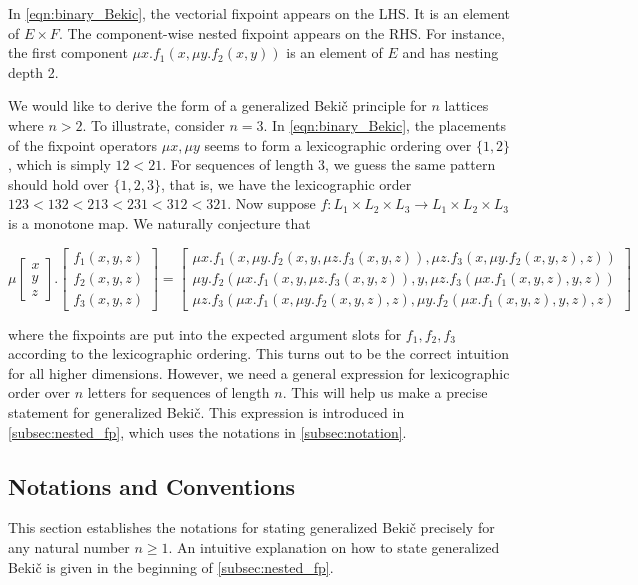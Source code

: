 In \autoref{eqn:binary_Bekic}, the vectorial fixpoint appears on the LHS. It is an element of $E\times F$. The component-wise nested fixpoint appears on the RHS. For instance, the first component $\mu x. f_1(x,\mu y.f_2(x,y))$ is an element of $E$ and has nesting depth 2.

We would like to derive the form of a generalized Beki\v{c} principle for $n$ lattices where $n>2$. To illustrate, consider $n=3$. In \autoref{eqn:binary_Bekic}, the placements of the fixpoint operators $\mu x, \mu y$ seems to form a lexicographic ordering over $\{1,2\}$, which is simply $12 < 21$. For sequences of length 3, we guess the same pattern should hold over $\{1,2,3\}$, that is, we have the lexicographic order $123 < 132 < 213 < 231 < 312 < 321$. Now suppose $f:L_1\times L_2\times L_3\rightarrow L_1\times L_2\times L_3$ is a monotone map. We naturally conjecture that

\begin{equation}
\label{eqn_3}
    \mu \begin{bmatrix}
        x \\ y \\ z
    \end{bmatrix}. \begin{bmatrix}
        f_1(x,y,z) \\
        f_2(x,y,z) \\
        f_3(x,y,z)
    \end{bmatrix} = \begin{bmatrix}
        \mu x. f_1(x,\mu y.f_2(x,y,\mu z. f_3(x,y,z)), \mu z. f_3(x,\mu y.f_2(x,y,z),z)) \\
        \mu y. f_2(\mu x.f_1(x,y,\mu z. f_3(x,y,z)), y, \mu z. f_3(\mu x. f_1(x,y,z), y ,z)) \\
        \mu z. f_3(\mu x.f_1(x,\mu y. f_2(x,y,z),z),\mu y.f_2(\mu x.f_1(x,y,z),y,z),z)
    \end{bmatrix}
\end{equation}

where the fixpoints are put into the expected argument slots for $f_1,f_2,f_3$ according to the lexicographic ordering. This turns out to be the correct intuition for all higher dimensions. However, we need a general expression for lexicographic order over $n$ letters for sequences of length $n$. This will help us make a precise statement for generalized Beki\v{c}. This expression is introduced in \autoref{subsec:nested_fp}, which uses the notations in \autoref{subsec:notation}.

\subsection{Notations and Conventions}
This section establishes the notations for stating generalized Beki\v{c} precisely for any natural number $n\geq 1$. An intuitive explanation on how to state generalized Beki\v{c} is given in the beginning of \autoref{subsec:nested_fp}.

